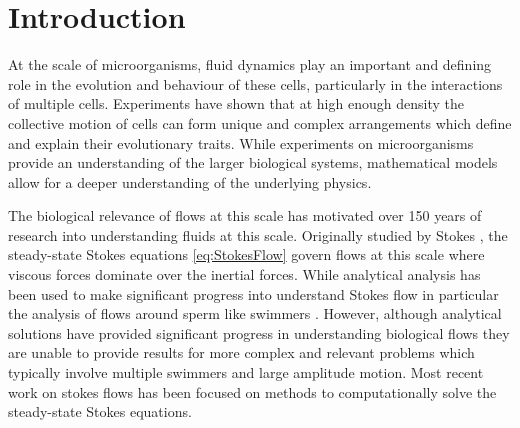 \section{Introduction}
At the scale of microorganisms,  fluid dynamics play an important and defining role in the evolution and behaviour of these cells, particularly in the interactions of multiple cells. Experiments have shown that at high enough density the collective motion of cells can form unique and complex arrangements which define and explain their evolutionary traits. While experiments on microorganisms provide an understanding of the larger biological systems, mathematical models allow for a deeper understanding of the underlying physics. 

The biological relevance of flows at this scale has motivated over 150 years of research into understanding fluids at this scale. Originally studied by Stokes \cite{Stokes2010OnPendulums}, the steady-state Stokes equations \cref{eq:StokesFlow} govern flows at this scale where viscous forces dominate over the inertial forces. While analytical analysis has been used to make significant progress into understand Stokes flow in particular the analysis of flows around sperm like swimmers \cite{Hancock1953TheLiquids,GRAY1955TheSpermatozoa,Taylor1951AnalysisOrganisms}. However, although analytical solutions have provided significant progress in understanding biological flows they are unable to provide results for more complex and relevant problems which typically involve multiple swimmers and large amplitude motion. Most recent work on stokes flows has been focused on methods to computationally solve the steady-state Stokes equations. 

